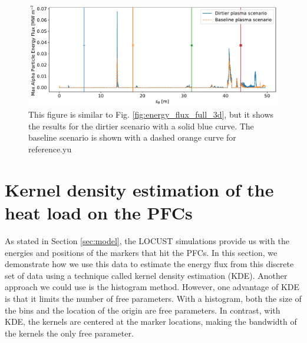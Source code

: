 \documentclass[10pt, a4paper, twoside]{article}
\begin{document}
\begin{figure}[!ht]
    \centering
    \includegraphics[width=0.99\linewidth]{Figures/energy_flux_spr_045_14_vs_spr_045_16.pdf}
    \caption{This figure is similar to Fig. \ref{fig:energy_flux_full_3d}, but it shows the results for the dirtier scenario with a solid blue curve. The baseline scenario is shown with a dashed orange curve for reference.yu}
    \label{fig:energy_flux_spr_045_14_vs_spr_045_16}
\end{figure}


\newpage
\clearpage
\section{Kernel density estimation of the heat load on the PFCs}
\label{appendix:kernel_density_estimation}

As stated in Section \ref{sec:model}, the LOCUST simulations provide us with the energies and positions of the markers that hit the PFCs. In this section, we demonstrate how we use this data to estimate the energy flux from this discrete set of data using a technique called kernel density estimation (KDE). Another approach we could use is the histogram method. However, one advantage of KDE is that it limits the number of free parameters. With a histogram, both the size of the bins and the location of the origin are free parameters. In contrast, with KDE, the kernels are centered at the marker locations, making the bandwidth of the kernels the only free parameter.
\end{document}
